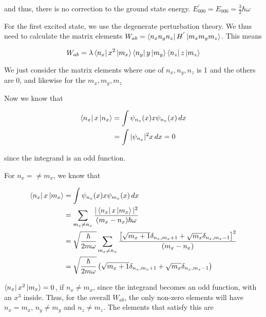     and thus, there is no correction to the ground state energy. $E^{'}_{000} = E_{000} = \frac{3}{2} \hbar \omega$

    For the first excited state, we use the degenerate perturbation theory. We thus need to calculate the matrix elements $W_{ab} = \bra{n_xn_yn_z}H^{'}\ket{m_xm_ym_z}$. This means

    \begin{equation*}
        W_{ab} = \lambda\bra{n_x}x^2\ket{m_x}\bra{n_y}y\ket{m_y}\bra{n_z}z\ket{m_z}
    \end{equation*}

    We just consider the matrix elements where one of $n_x , n_y , n_z$ is 1 and the others are 0, and likewise for the $m_x , m_y , m_z$

    Now we know that

    \begin{equation*}
        \begin{split}
            \bra{n_x}x\ket{n_x} & = \int \psi_{n_x}(x)x\psi_{n_x}(x) \, dx \\
            & = \int |\psi_{n_x}|^2 x \, dx = 0
        \end{split}
    \end{equation*}

    since the integrand is an odd function.

    For $n_x = \neq m_x$, we know that

    \begin{equation*}
        \begin{split}
            \bra{n_x}x\ket{m_x} & = \int \psi_{n_x}(x)x\psi_{m_x}(x) \, dx \\
            & = \sum_{m_x \neq n_x} \frac{|\bra{n_x}x\ket{m_x}|^2}{(m_x - n_x) \hbar\omega} \\
            & = \sqrt{\frac{\hbar}{2m\omega}} \sum_{m_x \neq n_x} \frac{\left[ \sqrt{m_x + 1}\delta_{n_x, m_x + 1} + \sqrt{m_x}\delta_{n_x, m_x - 1} \right]^2}{(m_x - n_x)} \\
            & = \sqrt{\frac{\hbar}{2m\omega}} \left( \sqrt{m_x + 1}\delta_{n_x, m_x + 1} + \sqrt{m_x}\delta_{n_x, m_x - 1} \right)
        \end{split}
    \end{equation*}

    $\bra{n_x}x^2\ket{m_x} = 0$, if $n_x \neq m_x$, since the integrand becomes an odd function, with an $x^3$ inside. Thus, for the overall $W_{ab}$, the only non-zero elements will have $n_x = m_x$, $n_y \neq m_y$ and $n_z \neq m_z$. The elements that satisfy this are 

